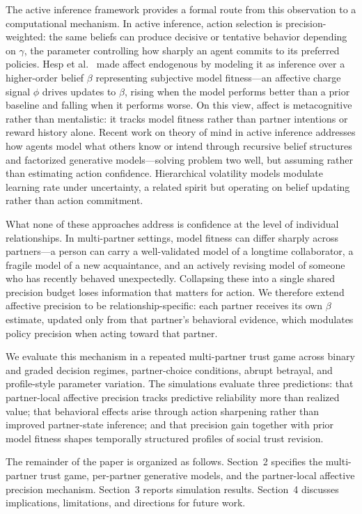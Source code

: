 The active inference framework \cite{Friston2010FreeEnergy,Friston2017ProcessTheory,Parr2022ActiveInference} provides a formal route from this observation to a computational mechanism. In active inference, action selection is precision-weighted: the same beliefs can produce decisive or tentative behavior depending on $\gamma$, the parameter controlling how sharply an agent commits to its preferred policies. Hesp et al.\ \cite{Hesp2021DeeplyFeltAffect} made affect endogenous by modeling it as inference over a higher-order belief $\beta$ representing subjective model fitness---an affective charge signal $\phi$ drives updates to $\beta$, rising when the model performs better than a prior baseline and falling when it performs worse. On this view, affect is metacognitive rather than mentalistic: it tracks model fitness rather than partner intentions or reward history alone. Recent work on theory of mind in active inference \cite{Pitliya2025ToMActiveInference,RuizSerra2025Factorised} addresses how agents model what others know or intend through recursive belief structures and factorized generative models---solving problem two well, but assuming rather than estimating action confidence. Hierarchical volatility models \cite{Mathys2011HGF,Behrens2008SocialLearning} modulate learning rate under uncertainty, a related spirit but operating on belief updating rather than action commitment.

What none of these approaches address is confidence at the level of individual relationships. In multi-partner settings, model fitness can differ sharply across partners---a person can carry a well-validated model of a longtime collaborator, a fragile model of a new acquaintance, and an actively revising model of someone who has recently behaved unexpectedly. Collapsing these into a single shared precision budget loses information that matters for action. We therefore extend affective precision to be relationship-specific: each partner receives its own $\beta$ estimate, updated only from that partner's behavioral evidence, which modulates policy precision when acting toward that partner.

We evaluate this mechanism in a repeated multi-partner trust game across binary and graded decision regimes, partner-choice conditions, abrupt betrayal, and profile-style parameter variation. The simulations evaluate three predictions: that partner-local affective precision tracks predictive reliability more than realized value; that behavioral effects arise through action sharpening rather than improved partner-state inference; and that precision gain together with prior model fitness shapes temporally structured profiles of social trust revision.

The remainder of the paper is organized as follows. Section~2 specifies the multi-partner trust game, per-partner generative models, and the partner-local affective precision mechanism. Section~3 reports simulation results. Section~4 discusses implications, limitations, and directions for future work.
